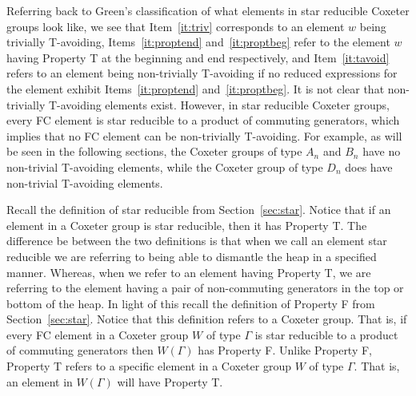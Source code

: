 Referring back to Green's classification of what elements in star reducible Coxeter groups look like, we see that Item~\ref{it:triv} corresponds to an element $w$ being trivially T-avoiding, Items~\ref{it:proptend} and~\ref{it:proptbeg} refer to the element $w$ having Property T at the beginning and end respectively, and Item~\ref{it:tavoid} refers to an element being non-trivially T-avoiding if no reduced expressions for the element exhibit Items~\ref{it:proptend} and~\ref{it:proptbeg}. It is not clear that non-trivially T-avoiding elements exist. However, in star reducible Coxeter groups, every FC element is star reducible to a product of commuting generators, which implies that no FC element can be non-trivially T-avoiding. For example, as will be seen in the following sections, the Coxeter groups of type $A_n$ and $B_n$ have no non-trivial T-avoiding elements, while the Coxeter group of type $D_n$ does have non-trivial T-avoiding elements. 

Recall the definition of star reducible from Section~\ref{sec:star}. Notice that if an element in a Coxeter group is star reducible, then it has Property T. The difference be between the two definitions is that when we call an element star reducible we are referring to being able to dismantle the heap in a specified manner. Whereas, when we refer to an element having Property T, we are referring to the element having a pair of non-commuting generators in the top or bottom of the heap. In light of this recall the definition of Property F from Section~\ref{sec:star}. Notice that this definition refers to a Coxeter group. That is, if every FC element in a Coxeter group $W$ of type $\Gamma$ is star reducible to a product of commuting generators then $W(\Gamma)$ has Property F. Unlike Property F, Property T refers to a specific element in a Coxeter group $W$ of type $\Gamma$. That is, an element in $W(\Gamma)$ will have Property T.


